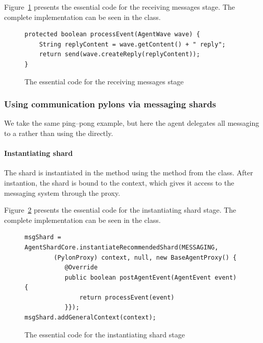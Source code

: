 \documentclass{article}
\begin{document}
Figure~\ref{fig:func:processEvent:code} presents the essential code for the receiving messages stage. The complete implementation can be seen in the  class.

\begin{figure}[ht]\centering
\begin{lstlisting}
protected boolean processEvent(AgentWave wave) {
    String replyContent = wave.getContent() + " reply";
    return send(wave.createReply(replyContent));
}
\end{lstlisting}
\caption{The essential code for the receiving messages stage}\label{fig:func:processEvent:code}
\end{figure}


\subsubsection{Using communication pylons via messaging shards}\label{sec:using-pylons-via-shards}

We take the same ping–pong example, but here the agent delegates all messaging to a  rather than using the  directly.


\paragraph{Instantiating shard} 

The shard is instantiated in the  method using the  method from the  class. After instantion, the shard is bound to the context, which gives it access to the messaging system through the proxy.

Figure~\ref{fig:func:registerPingPongAgent:code} presents the essential code for the instantiating shard stage. The complete implementation can be seen in the  class.

\begin{figure}[ht]\centering
\begin{lstlisting}
msgShard = AgentShardCore.instantiateRecommendedShard(MESSAGING,
		(PylonProxy) context, null, new BaseAgentProxy() {
		   @Override
		   public boolean postAgentEvent(AgentEvent event) {
			   return processEvent(event)
		   }});
msgShard.addGeneralContext(context);
\end{lstlisting}
\caption{The essential code for the instantiating shard stage}\label{fig:func:registerPingPongAgent:code}
\end{figure}
\end{document}
